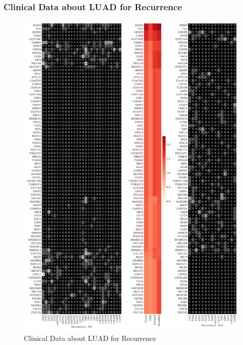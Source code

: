 \documentclass{beamer}
\begin{document}
    \begin{frame}[allowframebreaks]
        \frametitle{Clinical Data about LUAD for Recurrence}

        \begin{figure}
            \includegraphics[height=0.6 \textheight]{figures/GeneClinical/BWA-ADC.Recur.pdf}
            \caption{Clinical Data about LUAD for Recurrence}
        \end{figure}


\end{frame}
\end{document}
